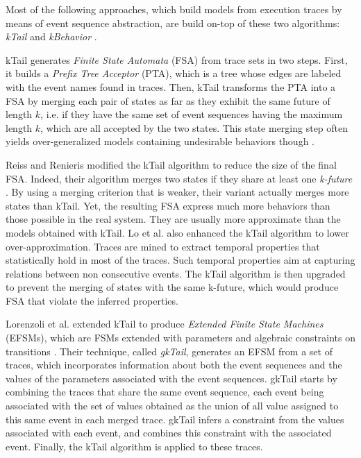 Most of the following approaches, which build models from
execution traces by means of event sequence abstraction, are
build on-top of these two algorithms: \textit{kTail}
\cite{5009015} and \textit{kBehavior} \cite{mariani2007dynamic}.

kTail generates \textit{Finite State Automata} (FSA) from trace
sets in two steps. First, it builds a \textit{Prefix Tree
Acceptor} (PTA), which is a tree whose edges are labeled with
the event names found in traces. Then, kTail transforms the PTA
into a FSA by merging each pair of states as far as they exhibit
the same future of length $k$, i.e. if they have the same set of
event sequences having the maximum length $k$, which are all
accepted by the two states. This state merging step often yields
over-generalized models containing undesirable behaviors though
\cite{4023976}.

Reiss and Renieris modified the kTail algorithm to reduce the
size of the final FSA.  Indeed, their algorithm merges two states
if they share at least one \textit{k-future} \cite{919096}. By
using a merging criterion that is weaker, their variant actually
merges more states than kTail. Yet, the resulting FSA
express much more behaviors than those possible in the real
system. They are usually more approximate than the models
obtained with kTail. Lo et al. \cite{Lo:2009:ASB:1595696.1595761}
also enhanced the kTail algorithm to lower over-approximation.
Traces are mined to extract temporal properties that
statistically hold in most of the traces. Such temporal
properties aim at capturing relations between non consecutive
events. The kTail algorithm is then upgraded to prevent the
merging of states with the same k-future, which would produce FSA
that violate the inferred properties.

Lorenzoli et al. extended kTail to produce \textit{Extended
Finite State Machines} (EFSMs), which are FSMs extended with
parameters and algebraic constraints on transitions
\cite{Lorenzoli2008}. Their technique, called \textit{gkTail},
generates an EFSM from a set of traces, which incorporates
information about both the event sequences and the values of the
parameters associated with the event sequences. gkTail starts by
combining the traces that share the same event sequence, each
event being associated with the set of values obtained as the
union of all value assigned to this same event in each merged
trace. gkTail infers a constraint from the values associated with
each event, and combines this constraint with the associated
event. Finally, the kTail algorithm is applied to these traces.

